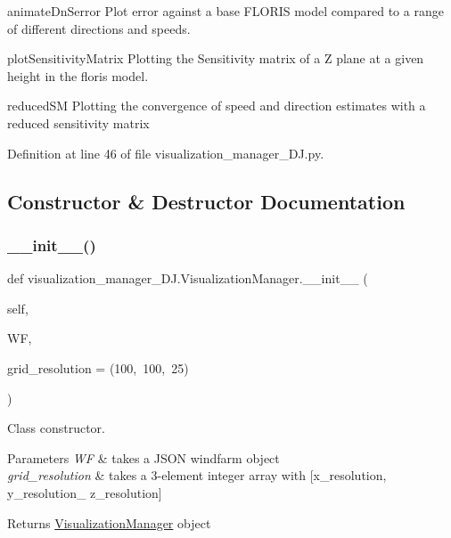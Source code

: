 \begin{DoxyEnumerate}
\item animate\+Dn\+Serror Plot error against a base F\+L\+O\+R\+IS model compared to a range of different directions and speeds.
\item plot\+Sensitivity\+Matrix Plotting the Sensitivity matrix of a Z plane at a given height in the floris model.
\item reduced\+SM Plotting the convergence of speed and direction estimates with a reduced sensitivity matrix 
\end{DoxyEnumerate}

Definition at line 46 of file visualization\+\_\+manager\+\_\+\+D\+J.\+py.



\subsection{Constructor \& Destructor Documentation}
\mbox{\label{classvisualization__manager___d_j_1_1_visualization_manager_ac262d79ceedca2ca4dd92b078a0851f1}} 
\subsubsection{\texorpdfstring{\+\_\+\+\_\+init\+\_\+\+\_\+()}{\_\_init\_\_()}}
{\footnotesize\ttfamily def visualization\+\_\+manager\+\_\+\+D\+J.\+Visualization\+Manager.\+\_\+\+\_\+init\+\_\+\+\_\+ (\begin{DoxyParamCaption}\item[{}]{self,  }\item[{}]{WF,  }\item[{}]{grid\+\_\+resolution = {\ttfamily (100,~100,~25)} }\end{DoxyParamCaption})}



Class constructor. 


\begin{DoxyParams}{Parameters}
{\em WF} & takes a J\+S\+ON windfarm object \\
\hline
{\em grid\+\_\+resolution} & takes a 3-\/element integer array with \mbox{[}x\+\_\+resolution, y\+\_\+resolution\+\_\+ z\+\_\+resolution\mbox{]} \\
\hline
\end{DoxyParams}
\begin{DoxyReturn}{Returns}
\mbox{\hyperlink{classvisualization__manager___d_j_1_1_visualization_manager}{Visualization\+Manager}} object 
\end{DoxyReturn}


